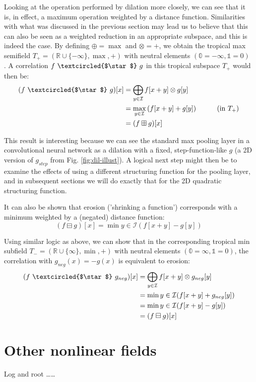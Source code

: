 \documentclass[a4paper, 12pt]{report}
\def\comment#1{\color{red}#1\color{black}}
\begin{document}
Looking at the operation performed by dilation more closely, we can see that it is, in effect, a maximum operation weighted by a distance function. Similarities with what was discussed in the previous section may lead us to believe that this can also be seen as a weighted reduction in an appropriate subspace, and this is indeed the case. By defining $\oplus=\max$ and $\otimes=+$, we obtain the tropical max semifield $T_+=(\mathbb{R}\cup\{-\infty\},\max,+)$ with neutral elements $(\mathbb{0}=-\infty, \mathbb{1}=0)$ \cite{bellaardaxiomatic}. A correlation $f ~\textcircled{$\star$}~ g$ in this tropical subspace $T_+$ would then be:
\begin{align*}
	(f ~\textcircled{$\star$}~ g)[x]
	&= \bigoplus_{y\in \mathcal{I}}f[x+y] \otimes g[y] \\
	&= \max_{y\in \mathcal{I}}\left(f[x+y] + g[y]\right) \hspace{1cm}\textrm{(in $T_+$)} \\
	&= (f \boxplus g)[x]
\end{align*}

This result is interesting because we can see the standard max pooling layer in a convolutional neural network as a dilation with a fixed, step-function-like $g$ (a 2D version of $g_{step}$ from Fig. \ref{fig:dil-illust}). A logical next step might then be to examine the effects of using a different structuring function for the pooling layer, and in subsequent sections we will do exactly that for the 2D quadratic structuring function.

It can also be shown that erosion ('shrinking a function') corresponds with a minimum weighted by a (negated) distance function: $$(f \boxminus g)[x]=\min{y\in \mathcal{I}}(f[x+y] - g[y])$$ 

Using similar logic as above, we can show that in the corresponding tropical min subfield $T_-=(\mathbb{R}\cup\{\infty\},\min,+)$ with neutral elements $(\mathbb{0}=\infty, \mathbb{1}=0)$, the correlation with $g_{neg}(x)=-g(x)$ is equivalent to erosion:
\begin{align*}
	(f ~\textcircled{$\star$}~ g_{neg})[x]
	&= \bigoplus_{y\in \mathcal{I}}f[x+y] \otimes g_{neg}[y] \\
	&= \min{y\in \mathcal{I}}(f[x+y] + g_{neg}[y]) \\
	&= \min{y\in \mathcal{I}}(f[x+y] - g[y]) \\
	&= (f \boxminus g)[x]
\end{align*}

\section{Other nonlinear fields}
Log and root \cite{bellaardaxiomatic} \comment{\ldots\ldots}
\end{document}
